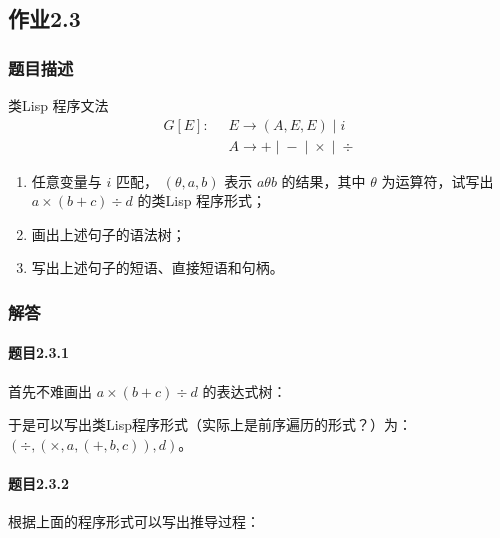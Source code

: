 \subsection{作业2.3}
\subsubsection{题目描述}
类Lisp 程序文法
\begin{align*}
    G[E]:\;\; &E \rightarrow(A, E, E)\;|\;i\\
    &A \rightarrow+\;|\;-\;|\;\times\;|\;{\div}
\end{align*}
\begin{enumerate}
\item 任意变量与  $i$  匹配，  $(\theta, a, b)$  表示  $a \theta b$  的结果，其中  $\theta$  为运算符，试写出  $a \times(b+c)  {\div} d$  的类Lisp 程序形式；
\item 画出上述句子的语法树；
\item 写出上述句子的短语、直接短语和句柄。
\end{enumerate}
\subsubsection{解答}

\paragraph{题目2.3.1} 首先不难画出 $a \times(b+c)  {\div} d$ 的表达式树：


\begin{center} 
\end{center} 

于是可以写出类Lisp程序形式（实际上是前序遍历的形式？）为：$({\div},(\times,a,(+,b,c)),d)$。

\paragraph{题目2.3.2} 根据上面的程序形式可以写出推导过程：

